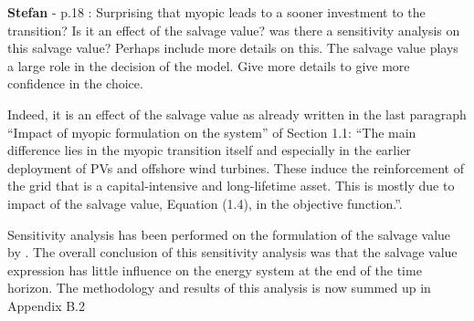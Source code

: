 \documentclass[12pt,a4paper]{article}
\begin{document}
\begin{mdframed}[style=comment] %
{\color{teal} \textbf{Stefan}} - p.18 : Surprising that myopic leads to a sooner investment to the transition? Is it an effect of the salvage value? was there a sensitivity analysis on this salvage value? Perhaps include more details on this. The salvage value plays a large role in the decision of the model. Give more details to give more confidence in the choice.
\end{mdframed}

\noindent Indeed, it is an effect of the salvage value as already written in the last paragraph ``Impact of myopic formulation on the system'' of Section 1.1: ``The main difference lies in the myopic transition itself and especially in the earlier
deployment of PVs and offshore wind turbines. These induce the reinforcement of the grid that is a capital-intensive and long-lifetime asset. This is mostly due to impact of the salvage value, Equation (1.4), in the objective function.''.

Sensitivity analysis has been performed on the formulation of the salvage value by \citet{goffauxpathway}. The overall conclusion of this sensitivity analysis was that the salvage value expression has little influence on the energy system at the end of the time horizon. The methodology and results of this analysis is now summed up {\color{blue}in Appendix B.2} 
\end{document}
